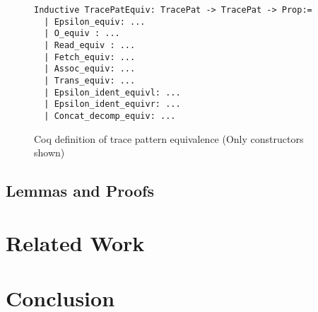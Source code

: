 \documentclass[10pt,  onecolumn]{article}
\begin{document}
\begin{figure}
\caption{ Coq definition of trace pattern equivalence (Only constructors shown) }
\label{fig:coq_TracePat_equiv}

\begin{lstlisting}
Inductive TracePatEquiv: TracePat -> TracePat -> Prop:=
  | Epsilon_equiv: ...
  | O_equiv : ...
  | Read_equiv : ...
  | Fetch_equiv: ...
  | Assoc_equiv: ...
  | Trans_equiv: ...
  | Epsilon_ident_equivl: ...
  | Epsilon_ident_equivr: ...
  | Concat_decomp_equiv: ...
\end{lstlisting}

\end{figure}







\subsection{ Lemmas and Proofs }



%


\section{Related Work}
\label{sec:relatedwork}


\section{Conclusion}
\label{sec:conclusion}


%
%
\cite{sf}
\cite{mtope}
\cite{techreport}
\cite{strongind}






\end{document}
